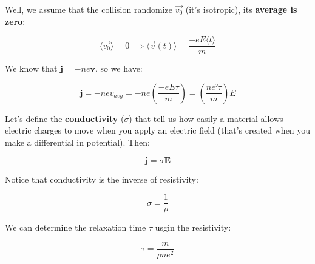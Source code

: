 Well, we assume that the collision randomize \textbf{$\vec{v_0}$} (it's isotropic), its \textbf{average is zero}:

$$
  \langle\vec{v_0}\rangle = 0 \implies \langle\vec{v}(t)\rangle = \frac{-eE\langle t \rangle}{m} $$

We know that $\textbf{j} = -ne\textbf{v}$, so we have:

\begin{equation}
  \textbf{j} = -nev_{avg} = -ne\left(\frac{-eE\tau}{m}\right) = \left(\frac{ne²\tau}{m}\right)E
\end{equation}

Let's define the \textbf{conductivity} ($\sigma$) that tell us how easily a material allows electric charges to move when you apply an electric field (that's created when you make a differential in potential). Then:

\begin{equation}
  \textbf{j} = \sigma \textbf{E}
\end{equation}

Notice that conductivity is the inverse of resistivity:

\begin{equation}
  \sigma = \frac{1}{\rho}
\end{equation}

We can determine the relaxation time $\tau$ usgin the resistivity:

\begin{equation}
  \tau = \frac{m}{\rho ne^2}
\end{equation}
